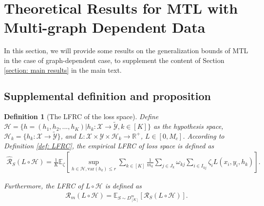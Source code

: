 \documentclass{article}
\def\sR{\mathbb{R}}
\def\eE{\mathbb{E}}
\newtheorem{definition}{Definition}
\begin{document}
\section{Theoretical Results for MTL with Multi-graph Dependent Data} 
\label{section: MTL gereral bound}

In this section, we will provide some results on the generalization bounds of MTL in the case of graph-dependent case, to supplement the content of Section \ref{section: main results} in the main text.
\subsection{Supplemental definition and proposition}
\begin{definition}[The LFRC of the loss space]
    Define $\mathcal{H}=\{ h = (h_1,h_2,...,h_K) | h_k: \mathcal{X} \rightarrow \widetilde{\mathcal{Y}}, k \in [K] \}$ as the hypothesis space, $\mathcal{H}_k = \{ h_k: \mathcal{X} \rightarrow \widetilde{\mathcal{Y}} \}$, and $L : \mathcal{X} \times \mathcal{Y} \times \mathcal{H}_k \rightarrow \sR^+$, $L \in [0,M_c]$. According to Definition \ref{def: LFRC}, the empirical LFRC of loss space is defined as
    \begin{align*}
        \hat{\mathcal{R}}_S (L \circ \mathcal{H}) = \frac{1}{K} \eE _\zeta \left[ \sup _{h \in \mathcal{H}, \mathrm{var}(h_k) \leq r} \sum _{k \in [K]} \frac{1}{m_k}   \sum _{j \in J_k} \omega_{kj}  \sum _{i \in I_{kj}} \zeta_i L(x_i,y_i,h_k)   \right].
    \end{align*}        

    Furthermore, the LFRC of $L \circ \mathcal{H}$ is defined as
    \begin{align*}
        \mathcal{R}_m (L \circ \mathcal{H}) = \eE _{S \sim D^m_{[K]}} [\mathcal{R}_S(L \circ \mathcal{H})].
    \end{align*}    
\end{definition} 
\end{document}
